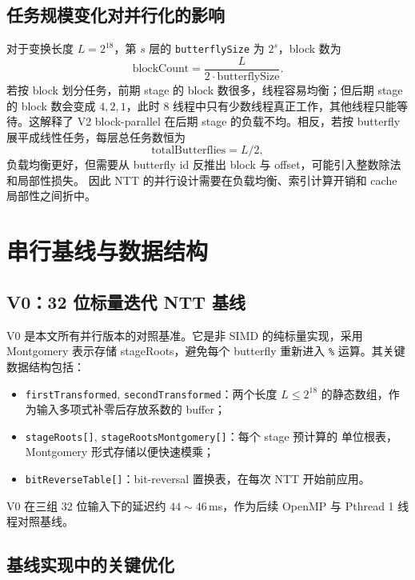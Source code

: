 \documentclass[UTF8,a4paper,10pt]{ctexart}
\begin{document}
\subsection{任务规模变化对并行化的影响}

对于变换长度 $L=2^{18}$，第 $s$ 层的 \texttt{butterflySize} 为 $2^s$，block 数为
\[
  \mathrm{blockCount}=\frac{L}{2\cdot \mathrm{butterflySize}}.
\]
若按 block 划分任务，前期 stage 的 block 数很多，线程容易均衡；但后期 stage 的 block 数会变成
$4,2,1$，此时 8 线程中只有少数线程真正工作，其他线程只能等待。这解释了 V2 block-parallel 在后期
stage 的负载不均。相反，若按 butterfly 展平成线性任务，每层总任务数恒为
\[
  \mathrm{totalButterflies}=L/2,
\]
负载均衡更好，但需要从 butterfly id 反推出 block 与 offset，可能引入整数除法和局部性损失。
因此 NTT 的并行设计需要在负载均衡、索引计算开销和 cache 局部性之间折中。

\section{串行基线与数据结构}

\subsection{V0：32 位标量迭代 NTT 基线}

V0 是本文所有并行版本的对照基准。它是非 SIMD 的纯标量实现，采用 Montgomery 表示存储
stageRoots，避免每个 butterfly 重新进入 \texttt{\%} 运算。其关键数据结构包括：

\begin{itemize}
  \item \texttt{firstTransformed}, \texttt{secondTransformed}：两个长度 $L \le 2^{18}$
        的静态数组，作为输入多项式补零后存放系数的 buffer；
  \item \texttt{stageRoots[]}, \texttt{stageRootsMontgomery[]}：每个 stage 预计算的
        单位根表，Montgomery 形式存储以便快速模乘；
  \item \texttt{bitReverseTable[]}：bit-reversal 置换表，在每次 NTT 开始前应用。
\end{itemize}

V0 在三组 32 位输入下的延迟约 $44\sim46$\,ms，作为后续 OpenMP 与 Pthread 1 线程对照基线。


\subsection{基线实现中的关键优化}
\end{document}

